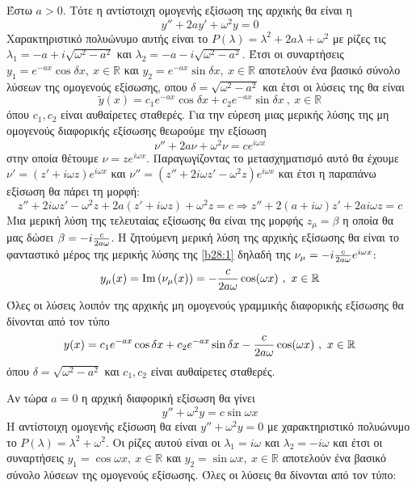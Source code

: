 \documentclass[a4paper,twoside,11pt]{book}
\DeclareRobustCommand{\frac}[3][0pt]{%
{\begingroup\hspace{#1}#2\hspace{#1}\endgroup\over\hspace{#1}#3\hspace{#1}}}
\begin{document}
\begin{rlist}
\item Έστω $ a>0 $. Τότε η αντίστοιχη ομογενής εξίσωση της αρχικής θα είναι η 
\[ y''+2ay'+\omega^2y=0 \]
Χαρακτηριστικό πολυώνυμο αυτής είναι το $ P(\lambda)=\lambda^2+2a\lambda+\omega^2 $ με ρίζες τις $ \lambda_1=-a+i\sqrt{\omega^2-a^2} $ και $ \lambda_2=-a-i\sqrt{\omega^2-a^2} $. Έτσι οι συναρτήσεις $ y_1=e^{-ax}\cos{\delta x},\ x\in\mathbb{R} $ και $ y_2=e^{-ax}\sin{\delta x},\ x\in\mathbb{R} $ αποτελούν ένα βασικό σύνολο λύσεων της ομογενούς εξίσωσης, οπου $ \delta=\sqrt{\omega^2-a^2} $ και έτσι οι λύσεις της θα είναι
\[ \tilde{y}(x)=c_1e^{-ax}\cos{\delta x}+c_2e^{-ax}\sin{\delta x}\ ,\ x\in\mathbb{R} \]
όπου $ c_1,c_2 $ είναι αυθαίρετες σταθερές. Για την εύρεση μιας μερικής λύσης της μη ομογενούς διαφορικής εξίσωσης θεωρούμε την εξίσωση
\begin{equation}\label{b28:1}
\nu''+2a\nu+\omega^2\nu=ce^{i\omega x}
\end{equation}
στην οποία θέτουμε $ \nu=ze^{i\omega x} $. Παραγωγίζοντας το μετασχηματισμό αυτό θα έχουμε $ \nu'=\left( z'+i\omega z\right) e^{i\omega x} $ και $ \nu''=\left( z''+2i\omega z'-\omega ^2z\right)e^{i\omega x} $ και έτσι η παραπάνω εξίσωση θα πάρει τη μορφή:
\[ z''+2i\omega z'-\omega ^2z+2a\left( z'+i\omega z\right)+\omega^2z=c\Rightarrow z''+2(a+i\omega) z'+2ai\omega z=c \]
Μια μερική λύση της τελευταίας εξίσωσης θα είναι της μορφής $ z_\mu=\beta $ η οποία θα μας δώσει $ \beta=-i\frac{c}{2a\omega} $. Η ζητούμενη μερική λύση της αρχικής εξίσωσης θα είναι το φανταστικό μέρος της μερικής λύσης της \eqref{b28:1} δηλαδή της $ \nu_\mu=-i\frac{c}{2a\omega}e^{i\omega x} $:
\[ y_\mu(x)=\mathrm{Im}\left( \nu_{\mu}(x)\right)=-\frac{c}{2a\omega}\cos(\omega x)\ ,\ x\in\mathbb{R} \]
Όλες οι λύσεις λοιπόν της αρχικής μη ομογενούς γραμμικής διαφορικής εξίσωσης θα δίνονται από τον τύπο
\[ y(x)=c_1e^{-ax}\cos{\delta x}+c_2e^{-ax}\sin{\delta x}-\frac{c}{2a\omega}\cos(\omega x)\ ,\ x\in\mathbb{R} \]
όπου $ \delta=\sqrt{\omega^2-a^2} $ και $ c_1,c_2 $ είναι αυθαίρετες σταθερές.
\item Αν τώρα $ a=0 $ η αρχική διαφορική εξίσωση θα γίνει \[ y''+\omega^2y=c\sin{\omega x} \]
Η αντίστοιχη ομογενής εξίσωση θα είναι $ y''+\omega^2y=0 $ με χαρακτηριστικό πολυώνυμο το $ P(\lambda)=\lambda^2+\omega^2 $. Οι ρίζες αυτού είναι οι $ \lambda_1=i\omega $ και $ \lambda_2=-i\omega $ και έτσι οι συναρτήσεις $ y_1=\cos{\omega x},\ x\in\mathbb{R} $ και $ y_2=\sin{\omega x},\ x\in\mathbb{R} $ αποτελούν ένα βασικό σύνολο λύσεων της ομογενούς εξίσωσης. Όλες οι λύσεις θα δίνονται από τον τύπο:

\end{rlist}
\end{document}
